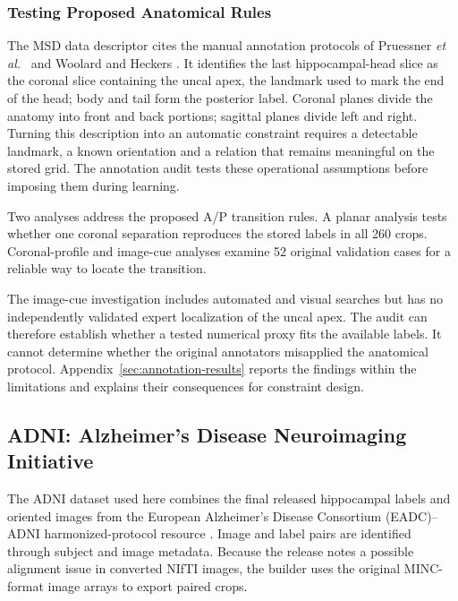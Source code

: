 \documentclass[12pt,a4paper]{article}
\begin{document}
\subsubsection{Testing Proposed Anatomical Rules}
\label{sec:annotation-compatibility}

The MSD data descriptor \cite{simpson2019dataset} cites the manual
annotation protocols of Pruessner \emph{et al.}\
\cite{pruessner2000volumetry} and Woolard and Heckers
\cite{woolard2012asymmetry}. It identifies the last hippocampal-head slice
as the coronal slice containing the uncal apex, the landmark used to mark
the end of the head; body and tail form the posterior label. Coronal planes
divide the anatomy into front and back portions; sagittal planes divide left
and right. Turning this description into an automatic constraint requires a
detectable landmark, a known orientation and a relation that remains
meaningful on the stored grid. The annotation audit tests these operational
assumptions before imposing them during learning.

Two analyses address the proposed A/P transition rules. A planar analysis tests
whether one coronal separation reproduces the stored labels in all
260 crops. Coronal-profile and image-cue analyses examine 52 original
validation cases for a reliable way to locate the transition.

The image-cue investigation includes automated and visual searches but
has no independently validated expert localization of the uncal apex.
The audit can therefore establish whether a tested numerical proxy fits
the available labels. It cannot determine whether the original annotators
misapplied the anatomical protocol. Appendix~\ref{sec:annotation-results}
reports the findings within the limitations and explains their
consequences for constraint design.


\subsection{ADNI: Alzheimer's Disease Neuroimaging Initiative}
\label{sec:adni-methods}

The ADNI dataset used here combines the final released hippocampal labels
and oriented images from the European Alzheimer's Disease Consortium
(EADC)--ADNI harmonized-protocol resource \cite{harpReleasedLabels}. Image
and label pairs are identified through subject and image metadata. Because
the release notes a possible alignment issue in converted NIfTI images, the
builder uses the original MINC-format image arrays to export paired crops.
\end{document}
